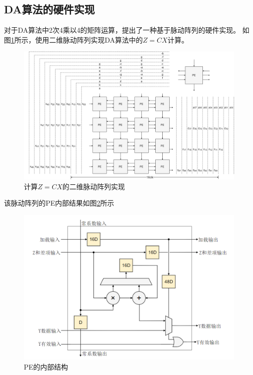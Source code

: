 \documentclass{article}
\numberwithin {equation}{section}
\begin{document}
\begin{spacing}{1.25}
    \subsection{DA算法的硬件实现}
      \vspace{1em}
      对于DA算法中2次4乘以4的矩阵运算，提出了一种基于脉动阵列的硬件实现。
      如图\ref{DCT脉动阵列}所示，使用二维脉动阵列实现DA算法中的$Z=CX$计算。
      \begin{figure}[H]
        \centering
        \includegraphics[scale=0.15]{./pictures/DCT脉动阵列.png}
        \caption{计算$Z=CX$的二维脉动阵列实现}
        \label{DCT脉动阵列}
      \end{figure}
      该脉动阵列的PE内部结果如图\ref{PE}所示
      \begin{figure}[H]
        \centering
        \includegraphics[scale=0.4]{./pictures/DCT_PE.png}
        \caption{PE的内部结构}
        \label{PE}
      \end{figure}

\end{spacing}
\end{document}
